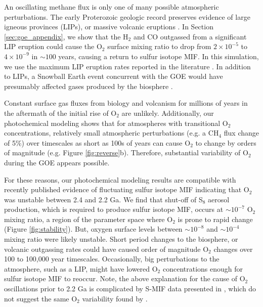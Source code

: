 An oscillating methane flux is only one of many possible atmospheric perturbations. The early Proterozoic geologic record preserves evidence of large igneous provinces (LIPs), or massive volcanic eruptions \citep{Gumsley_2017}. In Section \ref{sec:goe_appendix}, we show that the H$_2$ and CO outgassed from a significant LIP eruption could cause the O$_2$ surface mixing ratio to drop from $2 \times 10^{-5}$ to $4 \times 10^{-9}$ in $\sim100$ years, causing a return to sulfur isotope MIF. In this simulation, we use the maximum LIP eruption rates reported in the literature \citep{Bryan_2010}. In addition to LIPs, a Snowball Earth event concurrent with the GOE would have presumably affected gases produced by the biosphere \citep{Rasmussen_2013}.

Constant surface gas fluxes from biology and volcanism for millions of years in the aftermath of the initial rise of O$_2$ are unlikely. Additionally, our photochemical modeling shows that for atmospheres with transitional O$_2$ concentrations, relatively small atmospheric perturbations (e.g. a CH$_4$ flux change of 5\%) over timescales as short as 100s of years can cause O$_2$ to change by orders of magnitude (e.g. Figure \ref{fig:reverse}b). Therefore, substantial variability of O$_2$ during the GOE appears possible.

For these reasons, our photochemical modeling results are compatible with recently published evidence of fluctuating sulfur isotope MIF \citep{Poulton_2021, Gumsley_2017} indicating that O$_2$ was unstable between 2.4 and 2.2 Ga. We find that shut-off of S$_8$ aerosol production, which is required to produce sulfur isotope MIF, occurs at $\sim10^{-7}$ O$_2$ mixing ratio, a region of the parameter space where O$_2$ is prone to rapid change (Figure \ref{fig:stability}). But, oxygen surface levels between $\sim10^{-8}$ and $\sim10^{-4}$ mixing ratio were likely unstable. Short period changes to the biosphere, or volcanic outgassing rates could have caused order of magnitude O$_2$ changes over 100 to 100,000 year timescales. Occasionally, big perturbations to the atmosphere, such as a LIP, might have lowered O$_2$ concentrations enough for sulfur isotope MIF to reoccur. Note, the above explanation for the cause of O$_2$ oscillations prior to 2.2 Ga is complicated by S-MIF data presented in \citet{Izon_2022}, which do not suggest the same O$_2$ variability found by \citet{Poulton_2021}.

